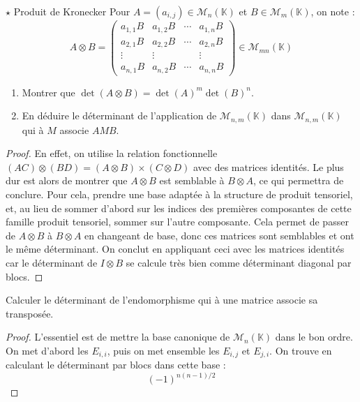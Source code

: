 \documentclass[french,a4paper]{article}
\newcommand{\K}{\mathbb{K}}
\theoremstyle{plain}
\theoremstyle{definition}
\theoremstyle{remark}
\begin{document}
\begin{ex}{$\star$ Produit de Kronecker} Pour $A=(a_{i,j})\in\mathcal{M}_n(\K)$ et $B\in\mathcal{M}_m(\K)$, on note : $$A\otimes B=\begin{pmatrix}
		a_{1,1}B&a_{1,2}B&\cdots&a_{1,n}B\\
		a_{2,1}B&a_{2,2}B&\cdots&a_{2,n}B\\
		\vdots&\vdots&&\vdots\\
		a_{n,1}B&a_{n,2}B&\cdots&a_{n,n}B
	\end{pmatrix}\in\mathcal{M}_{mn}(\K)$$
	\begin{enumerate}
		\item Montrer que $\det(A\otimes B)=\det(A)^m\det(B)^n$.
		\item En déduire le déterminant de l'application de $\mathcal{M}_{n,m}(\K)$ dans $\mathcal{M}_{n,m}(\K)$ qui à $M$ associe $AMB$.
	\end{enumerate}
\end{ex}\begin{proof}
	En effet, on utilise la relation fonctionnelle $(AC)\otimes(BD)=(A\otimes B)\times(C\otimes D)$ avec des matrices identités. Le plus dur est alors de montrer que $A\otimes B$ est semblable à $B\otimes A$, ce qui permettra de conclure. Pour cela, prendre une base adaptée à la structure de produit tensoriel, et, au lieu de sommer d'abord sur les indices des premières composantes de cette famille produit tensoriel, sommer sur l'autre composante. Cela permet de passer de $A\otimes B$ à $B\otimes A$ en changeant de base, donc ces matrices sont semblables et ont le même déterminant. On conclut en appliquant ceci avec les matrices identités car le déterminant de $I\otimes B$ se calcule très bien comme déterminant diagonal par blocs.
\end{proof}

\begin{ex}{}
	Calculer le déterminant de l'endomorphisme qui à une matrice associe sa transposée.
\end{ex}
\begin{proof}
	L'essentiel est de mettre la base canonique de $\mathcal{M}_n(\K)$ dans le bon ordre. On met d'abord les $E_{i,i}$, puis on met ensemble les $E_{i,j}$ et $E_{j,i}$. On trouve en calculant le déterminant par blocs dans cette base : $$(-1)^{n(n-1)/2}$$
\end{proof}
\end{document}
